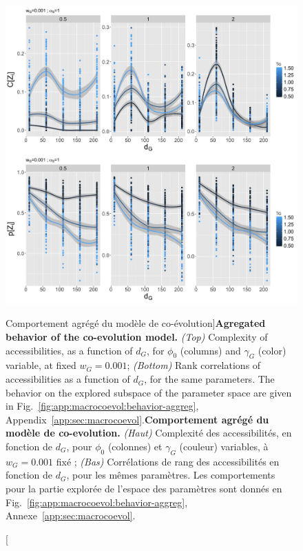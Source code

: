 \begin{figure}
\includegraphics[width=\linewidth]{Figures/Final/6-2-2-fig-macrocoevol-behavior-aggreg.jpg}
\caption[Agregated behavior of the co-evolution model][Comportement agrégé du modèle de co-évolution]{\textbf{Agregated behavior of the co-evolution model.} \textit{(Top)} Complexity of accessibilities, as a function of $d_G$, for $\phi_0$ (columns) and $\gamma_G$ (color) variable, at fixed $w_G = 0.001$; \textit{(Bottom)} Rank correlations of accessibilities as a function of $d_G$, for the same parameters. The behavior on the explored subspace of the parameter space are given in Fig.~\ref{fig:app:macrocoevol:behavior-aggreg}, Appendix~\ref{app:sec:macrocoevol}.\label{fig:macrocoevol:behavior-aggreg}}{\textbf{Comportement agrégé du modèle de co-evolution.} \textit{(Haut)} Complexité des accessibilités, en fonction de $d_G$, pour $\phi_0$ (colonnes) et $\gamma_G$ (couleur) variables, à $w_G = 0.001$ fixé ; \textit{(Bas)} Corrélations de rang des accessibilités en fonction de $d_G$, pour les mêmes paramètres. Les comportements pour la partie explorée de l'espace des paramètres sont donnés en Fig.~\ref{fig:app:macrocoevol:behavior-aggreg}, Annexe~\ref{app:sec:macrocoevol}.\label{fig:macrocoevol:behavior-aggreg}}
\end{figure}



